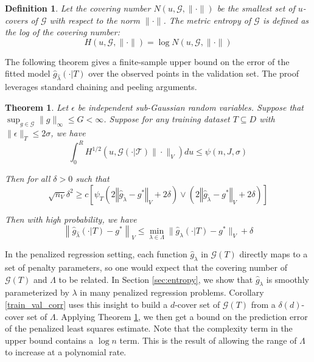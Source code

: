 \documentclass[12pt]{article}
\newtheorem{theorem}{Theorem}
\newtheorem{definition}{Definition}
\begin{document}
\begin{definition}
Let the covering number $N(u, \mathcal{G}, \| \cdot \|)$ be the smallest set of $u$-covers of $\mathcal{G}$ with respect to the norm $\| \cdot \|$. The metric entropy of $\mathcal{G}$ is defined as the log of the covering number:
\begin{equation}
H (u, \mathcal{G}, \| \cdot \| ) = \log N(u, \mathcal{G}, \| \cdot \|)
\end{equation}
\end{definition}

The following theorem gives a finite-sample upper bound on the error of the fitted model $\hat{g}_{\hat \lambda}(\cdot | T)$ over the observed points in the validation set. The proof leverages standard chaining and peeling arguments.

\begin{theorem}
\label{train_val_thrm}
Let $\epsilon$ be independent sub-Gaussian random variables. 
Suppose that $\sup_{g \in \mathcal{G}} \| g \|_\infty \le G < \infty$.
Suppose for any training dataset $T \subseteq D$ with $\| \epsilon \|_T \le 2 \sigma$, we have
\begin{equation}
\int_0^R H^{1/2} \left ( u, \mathcal{G(\cdot | T)} \| \cdot \|_V \right ) du \le \psi(n, J, \sigma)
\end{equation}

Then for all $\delta  > 0$ such that
\begin{equation}
\sqrt{n_{V}}\delta^{2}
\ge 
c \left[
\psi_{T}\left(2\left\Vert \hat{g}_{\tilde{\lambda}}-g^{*}\right\Vert _{V} + 2\delta\right)
\vee
\left(2\left\Vert \hat{g}_{\tilde{\lambda}}-g^{*}\right\Vert _{V}+2\delta\right)
\right]
\end{equation}

Then with high probability, we have
\begin{equation}
\label{error_bound}
\left \|\hat{g}_{\hat{\lambda} }(\cdot | T) - g^* \right \|_V
\le 
\min_{\lambda \in \Lambda}\| \hat{g}_{\lambda}(\cdot | T) - g^*\|_V
+ \delta
\end{equation}
\end{theorem}

In the penalized regression setting, each function $\hat{g}_\lambda$ in $\mathcal{G}(T)$ directly maps to a set of penalty parameters, so one would expect that the covering number of $\mathcal{G}(T)$ and $\Lambda$ to be related. In Section \ref{sec:entropy}, we show that $\hat{g}_\lambda$ is smoothly parameterized by $\lambda$ in many penalized regression problems. Corollary \ref{train_val_corr} uses this insight to build a $d$-cover set of $\mathcal{G}(T)$ from a $\delta(d)$-cover set of $\Lambda$. Applying Theorem \ref{train_val_thrm}, we then get a bound on the prediction error of the penalized least squares estimate. Note that the complexity term in the upper bound contains a $\log n$ term. This is the result of allowing the range of $\Lambda$ to increase at a polynomial rate.
\end{document}
